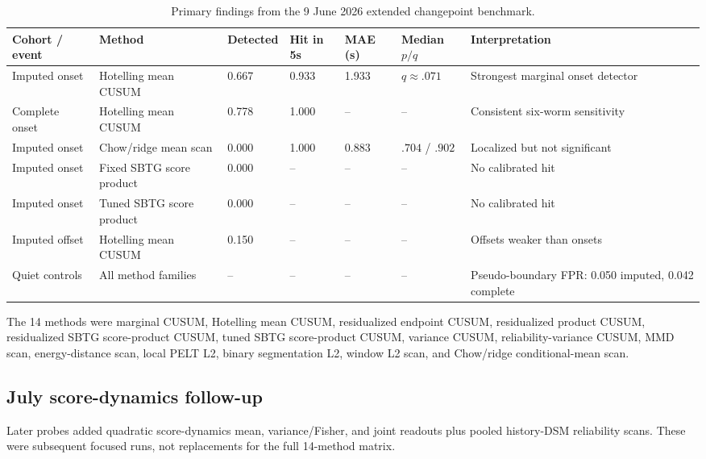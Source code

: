 \documentclass[10pt]{article}
\begin{document}
\begin{table}[H]
\centering\scriptsize
\begin{tabularx}{\linewidth}{L{1.55cm}L{1.40cm}L{1.10cm}L{0.75cm}L{0.65cm}L{1.00cm}Y}
\toprule
Cohort / event & Method & Detected & Hit in 5s & MAE (s) & Median $p/q$ & Interpretation \\
\midrule
Imputed onset & Hotelling mean CUSUM & 0.667 & 0.933 & 1.933 & $q\approx.071$ & Strongest marginal onset detector \\
Complete onset & Hotelling mean CUSUM & 0.778 & 1.000 & -- & -- & Consistent six-worm sensitivity \\
Imputed onset & Chow/ridge mean scan & 0.000 & 1.000 & 0.883 & $.704$ / $.902$ & Localized but not significant \\
Imputed onset & Fixed SBTG score product & 0.000 & -- & -- & -- & No calibrated hit \\
Imputed onset & Tuned SBTG score product & 0.000 & -- & -- & -- & No calibrated hit \\
Imputed offset & Hotelling mean CUSUM & 0.150 & -- & -- & -- & Offsets weaker than onsets \\
Quiet controls & All method families & -- & -- & -- & -- & Pseudo-boundary FPR: 0.050 imputed, 0.042 complete \\
\bottomrule
\end{tabularx}
\caption{Primary findings from the 9 June 2026 extended changepoint benchmark.}
\end{table}

The 14 methods were marginal CUSUM, Hotelling mean CUSUM, residualized endpoint CUSUM, residualized product CUSUM, residualized SBTG score-product CUSUM, tuned SBTG score-product CUSUM, variance CUSUM, reliability-variance CUSUM, MMD scan, energy-distance scan, local PELT L2, binary segmentation L2, window L2 scan, and Chow/ridge conditional-mean scan.

\subsection{July score-dynamics follow-up}

Later probes added quadratic score-dynamics mean, variance/Fisher, and joint readouts plus pooled history-DSM reliability scans. These were subsequent focused runs, not replacements for the full 14-method matrix.
\end{document}
